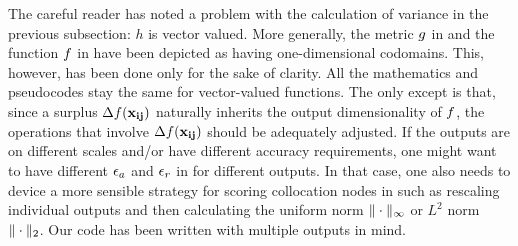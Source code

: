 The careful reader has noted a problem with the calculation of variance in the
previous subsection: $h$ is vector valued. More generally, the metric $g$ in
 and the function $f$ in  have been depicted
as having one-dimensional codomains. This, however, has been done only for the
sake of clarity. All the mathematics and pseudocodes stay the same for
vector-valued functions. The only except is that, since a surplus
$\Delta f(\mathbf{x}_{\mathbf{i}\mathbf{j}})$ naturally inherits the output dimensionality of $f$,
the operations that involve $\Delta f(\mathbf{x}_{\mathbf{i}\mathbf{j}})$ should be adequately
adjusted. If the outputs are on different scales and/or have different accuracy
requirements, one might want to have different $\epsilon_a$ and $\epsilon_r$ in
 for different outputs. In that case, one also needs to
device a more sensible strategy for scoring collocation nodes in 
such as rescaling individual outputs and then calculating the uniform norm
$\| \cdot \|_\infty$ or $L^2$ norm $\| \cdot \|_2$. Our code \cite{sources}
has been written with multiple outputs in mind.

